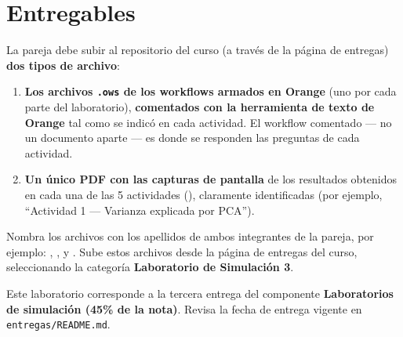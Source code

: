 \documentclass[11pt,letterpaper]{article}
\newcommand{\faPencil}{\raisebox{-0.1em}{\textbf{\Large\textbullet}}}
\begin{document}
\section{Entregables}

La pareja debe subir al repositorio del curso (a través de la página de entregas) \textbf{dos tipos de archivo}:

\begin{enumerate}[leftmargin=1.2cm]
  \item \textbf{Los archivos \texttt{.ows} de los workflows armados en Orange} (uno por cada parte del laboratorio), \textbf{comentados con la herramienta de texto de Orange} tal como se indicó en cada actividad. El workflow comentado --- no un documento aparte --- es donde se responden las preguntas de cada actividad.
  \item \textbf{Un único PDF con las capturas de pantalla} de los resultados obtenidos en cada una de las 5 actividades (\faPencil), claramente identificadas (por ejemplo, ``Actividad 1 --- Varianza explicada por PCA'').
\end{enumerate}

Nombra los archivos con los apellidos de ambos integrantes de la pareja, por ejemplo: \texttt{}, \texttt{}, \texttt{} y \texttt{}. Sube estos archivos desde la página de entregas del curso, seleccionando la categoría \textbf{Laboratorio de Simulación 3}.

\begin{nota}
Este laboratorio corresponde a la tercera entrega del componente \textbf{Laboratorios de simulación (45\% de la nota)}. Revisa la fecha de entrega vigente en \texttt{entregas/README.md}.
\end{nota}
\end{document}
